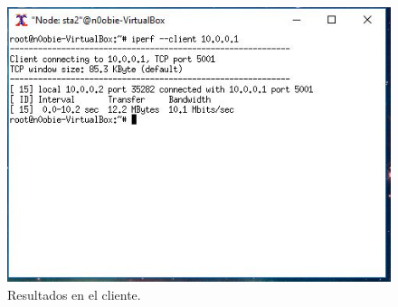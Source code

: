 \begin{figure}[!htb]
  \centering
    \includegraphics[width=0.7\linewidth]{./img/anexos/4.JPG}
    \caption{Resultados en el cliente.}
  \label{fig:yo}
\end{figure}
